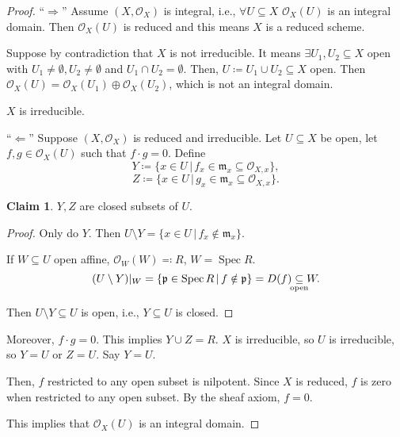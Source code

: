 \documentclass[12pt]{article}
\DeclareMathOperator{\Spec}{Spec}
\theoremstyle{definition}
\newtheorem*{claim}{Claim}
\begin{document}
\begin{proof}
``$\Rightarrow$'' Assume $(X,\mathcal O_X)$ is integral, i.e., $\forall U\subseteq X$ $\mathcal O_X(U)$ is an integral domain. Then $\mathcal O_X(U)$ is reduced and this means $X$ is a reduced scheme.

Suppose by contradiction that $X$ is not irreducible. It means $\exists U_1,U_2\subseteq X$ open with $U_1\neq\emptyset,U_2\neq\emptyset$ and $U_1\cap U_2=\emptyset$. Then, $U\coloneqq U_1\cup U_2\subseteq X$ open. Then $\mathcal O_X(U)=\mathcal O_X(U_1)\oplus\mathcal O_X(U_2)$, which is not an integral domain. \Lightning

$X$ is irreducible.

``$\Leftarrow$'' Suppose $(X,\mathcal O_X)$ is reduced and irreducible. Let $U\subseteq X$ be open, let $f,g\in\mathcal O_X(U)$ such that $f\cdot g=0$. Define
\[Y\coloneqq\{x\in U\,|\,f_x\in\mathfrak m_x\subseteq\mathcal O_{X,x}\},\]
\[Z\coloneqq\{x\in U\,|\,g_x\in\mathfrak m_x\subseteq\mathcal O_{X,x}\}.\]

\begin{claim}
$Y,Z$ are closed subsets of $U$.
\end{claim}

\begin{proof}
Only do $Y$. Then $U\setminus Y=\{x\in U\,|\,f_x\notin\mathfrak m_x\}$.

If $W\subseteq U$ open affine, $\mathcal O_W(W)\eqqcolon R$, $W=\Spec R$.
\[(U\setminus Y)|_W=\{\mathfrak p\in\Spec R\,|\,f\notin\mathfrak p\}=D(f)\underset{\mathclap{\text{open}}}\subseteq W.\]

Then $U\setminus Y\subseteq U$ is open, i.e., $Y\subseteq U$ is closed.
\end{proof}

Moreover, $f\cdot g=0$. This implies $Y\cup Z=R$. $X$ is irreducible, so $U$ is irreducible, so $Y=U$ or $Z=U$. Say $Y=U$.

Then, $f$ restricted to any open subset is nilpotent. Since $X$ is reduced, $f$ is zero when restricted to any open subset. By the sheaf axiom, $f=0$.

This implies that $\mathcal O_X(U)$ is an integral domain.
\end{proof}
\end{document}
